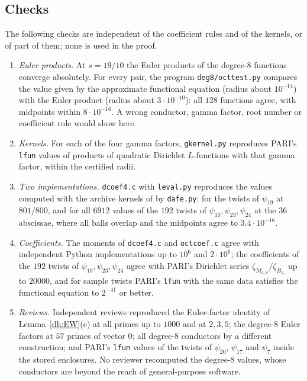 \subsection{Checks}\label{lv:checks}
The following checks are independent of the coefficient rules and of the
kernels, or of part of them; none is used in the proof.
\begin{enumerate}
\item[(1)] \emph{Euler products.} At $s=19/10$ the Euler products of the
 degree-$8$ functions converge absolutely. For every pair, the program
 \texttt{deg8/octtest.py} compares the value given by the approximate
 functional equation (radius about $10^{-14}$) with the Euler product
 (radius about $3\cdot10^{-10}$): all $128$ functions agree, with midpoints
 within $8\cdot10^{-16}$. A wrong conductor, gamma factor, root number or
 coefficient rule would show here.
\item[(2)] \emph{Kernels.} For each of the four gamma factors, \texttt{gkernel.py}
 reproduces PARI's \texttt{lfun} values of products of quadratic Dirichlet
 $L$-functions with that gamma factor, within the certified radii.
\item[(3)] \emph{Two implementations.} \texttt{dcoef4.c} with
 \texttt{leval.py} reproduces the values computed with the archive kernels of
 \cite{Naslund0418235} by \texttt{dafe.py}: for the twists of
 $\psi_{19}$ at $801/800$, and for all $6912$ values of the $192$ twists of
 $\psi_{10},\psi_{23},\psi_{24}$ at the $36$ abscissae, where all balls overlap
 and the midpoints agree to $3.4\cdot10^{-16}$.
\item[(4)] \emph{Coefficients.} The moments of \texttt{dcoef4.c} and
 \texttt{octcoef.c} agree with independent Python implementations up to
 $10^6$ and $2\cdot10^6$; the coefficients of the $192$ twists of
 $\psi_{10},\psi_{23},\psi_{24}$ agree with PARI's Dirichlet series
 $\zeta_{M_{o,w}}/\zeta_{B_{c_o}}$ up to $20000$, and for sample twists PARI's
 \texttt{lfun} with the same data satisfies the functional equation to
 $2^{-41}$ or better.
\item[(5)] \emph{Reviews.} Independent reviews reproduced the Euler-factor
 identity of Lemma~\ref{dh:EW}(e) at all primes up to $1000$ and at $2,3,5$;
 the degree-$8$ Euler factors at $57$ primes of vector $0$; all degree-$8$
 conductors by a different construction; and PARI's \texttt{lfun} values of
 the twists of $\psi_{20}$, $\psi_{17}$ and $\psi_7$ inside the stored
 enclosures. No reviewer recomputed the degree-$8$ values, whose conductors
 are beyond the reach of general-purpose software.
\end{enumerate}

